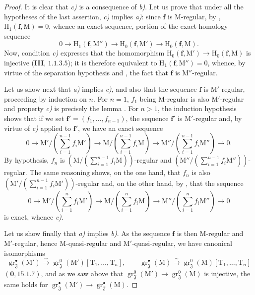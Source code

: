 \begin{proof}
It is clear that \emph{c)} is a consequence of \emph{b)}. Let us prove that under all the hypotheses of the last assertion, \emph{c)} implies \emph{a)}: since $\mathbf{f}$ is M-regular, by , $\mathrm{H}_1(\mathbf{f},\mathrm{M})=0$, whence an exact sequence, portion of the exact homology sequence
\[
  0\to\mathrm{H}_1(\mathbf{f},\mathrm{M}'')\to\mathrm{H}_0(\mathbf{f},\mathrm{M}')\to\mathrm{H}_0(\mathbf{f},\mathrm{M}).
\]
Now, condition \emph{c)} expresses that the homomorphism $\mathrm{H}_0(\mathbf{f},\mathrm{M}')\to\mathrm{H}_0(\mathbf{f},\mathrm{M})$ is injective (\textbf{III}, $1.1.3.5$); it is therefore equivalent to $\mathrm{H}_1(\mathbf{f},\mathrm{M}'')=0$, whence, by virtue of the separation hypothesis and , the fact that $\mathbf{f}$ is $\mathrm{M}''$-regular.

Let us show next that \emph{a)} implies \emph{c)}, and also that the sequence $\mathbf{f}$ is $\mathrm{M}'$-regular, proceeding by induction on $n$. For $n=1$, $f_1$ being M-regular is also $\mathrm{M}'$-regular and property \emph{c)} is precisely the lemma . For $n>1$, the induction hypothesis shows that
if we set $\mathbf{f}'=(f_1,\ldots,f_{n-1})$, the sequence $\mathbf{f}'$ is $\mathrm{M}'$-regular and, by virtue of \emph{c)} applied to $\mathbf{f}'$, we have an exact sequence
\[
  0\to\mathrm{M}'/(\textstyle\sum_{i=1}^{n-1}f_i\mathrm{M}')\to\mathrm{M}/(\textstyle\sum_{i=1}^{n-1}f_i\mathrm{M})\to\mathrm{M}''/(\textstyle\sum_{i=1}^{n-1}f_i\mathrm{M}'')\to 0.
\]
By hypothesis, $f_n$ is $(\mathrm{M}/(\sum_{i=1}^{n-1}f_i\mathrm{M}))$-regular and $(\mathrm{M}''/(\sum_{i=1}^{n-1}f_i\mathrm{M}''))$-regular. The same reasoning shows, on the one hand, that $f_n$ is also $(\mathrm{M}'/(\sum_{i=1}^{n-1}f_i\mathrm{M}'))$-regular and, on the other hand, by , that the sequence
\[
  0\to\mathrm{M}'/(\textstyle\sum_{i=1}^{n}f_i\mathrm{M}')\to\mathrm{M}/(\textstyle\sum_{i=1}^{n}f_i\mathrm{M})\to\mathrm{M}''/(\textstyle\sum_{i=1}^{n}f_i\mathrm{M}'')\to 0
\]
is exact, whence \emph{c)}.

Let us show finally that \emph{a)} implies \emph{b)}. As the sequence $\mathbf{f}$ is then M-regular and $\mathrm{M}'$-regular, hence M-quasi-regular and $\mathrm{M}'$-quasi-regular, we have canonical isomorphisms
\[
  \operatorname{gr}_\mathfrak{J}^\bullet(\mathrm{M}')\xrightarrow{\sim}\operatorname{gr}_\mathfrak{J}^0(\mathrm{M}')[\mathrm{T}_1,\ldots,\mathrm{T}_n],\qquad
  \operatorname{gr}_\mathfrak{J}^\bullet(\mathrm{M})\xrightarrow{\sim}\operatorname{gr}_\mathfrak{J}^0(\mathrm{M})[\mathrm{T}_1,\ldots,\mathrm{T}_n]
\]
$(\mathbf{0},15.1.7)$, and as we saw above that $\operatorname{gr}_\mathfrak{J}^0(\mathrm{M}')\to\operatorname{gr}_\mathfrak{J}^0(\mathrm{M})$ is injective, the same holds for $\operatorname{gr}_\mathfrak{J}^\bullet(\mathrm{M}')\to\operatorname{gr}_\mathfrak{J}^\bullet(\mathrm{M})$.


\end{proof}

